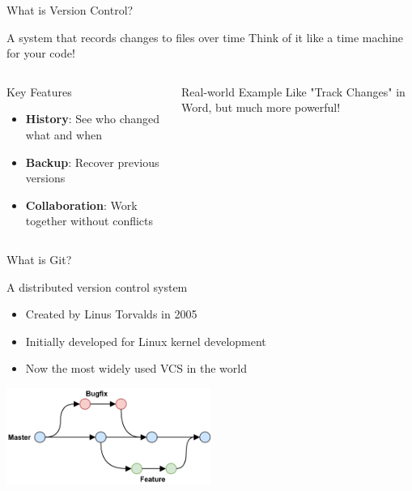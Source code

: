 \documentclass[aspectratio=169]{beamer}
\begin{document}
\begin{frame}{What is Version Control?}
  \begin{block}{A system that records changes to files over time}
    Think of it like a time machine for your code!
  \end{block}
  
  \begin{columns}
    \begin{column}{0.5\textwidth}
      \begin{block}{Key Features}
        \begin{itemize}
          \item \textbf{History}: See who changed what and when
          \item \textbf{Backup}: Recover previous versions
          \item \textbf{Collaboration}: Work together without conflicts
        \end{itemize}
      \end{block}
    \end{column}
    \begin{column}{0.45\textwidth}
      \begin{exampleblock}{Real-world Example}
        Like "Track Changes" in Word, but much more powerful!
      \end{exampleblock}
    \end{column}
  \end{columns}
\end{frame}

\begin{frame}{What is Git?}
  \begin{block}{A distributed version control system}
    \begin{itemize}
      \item Created by Linus Torvalds in 2005
      \item Initially developed for Linux kernel development
      \item Now the most widely used VCS in the world
    \end{itemize}
  \end{block}
  
  \vspace{1em}
  \begin{center}
    \includegraphics[width=0.5\textwidth]{figures/gitWorkflowDiagram.png}
  \end{center}
\end{frame}
\end{document}
